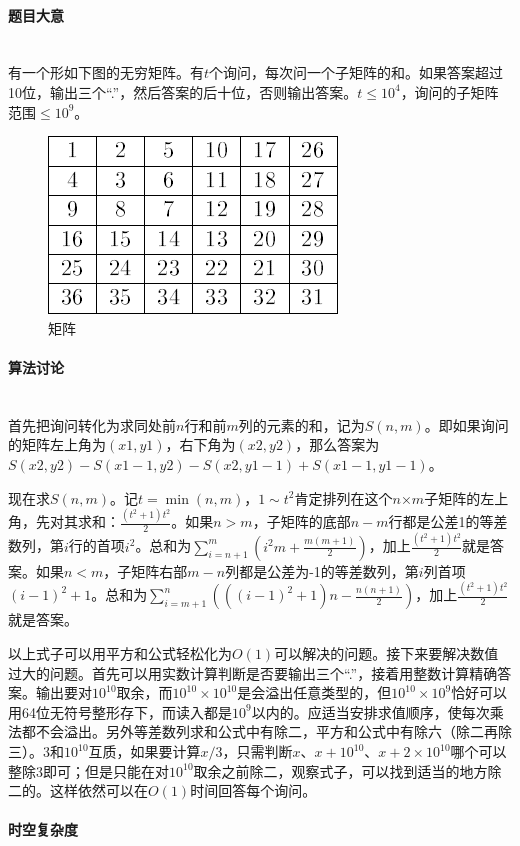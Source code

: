 \documentclass[UTF8]{ctexart}
\newcommand{\myparagraph}[1]{\paragraph{#1}\mbox{}\\}
\theoremstyle{nonumberplain}
\begin{document}
		\myparagraph{题目大意}
		
			有一个形如下图的无穷矩阵。有$t$个询问，每次问一个子矩阵的和。如果答案超过10位，输出三个“.”，然后答案的后十位，否则输出答案。$t \leq 10^4$，询问的子矩阵范围$\leq 10^9$。
			
			\begin{figure}[ht]
				\centering
				\includegraphics[width=.7\textwidth]{fig249e_1.png}
				\caption{矩阵}
			\end{figure}
		
		\myparagraph{算法讨论}
		
			首先把询问转化为求同处前$n$行和前$m$列的元素的和，记为$S(n,m)$。即如果询问的矩阵左上角为$(x1,y1)$，右下角为$(x2,y2)$，那么答案为$S(x2,y2)-S(x1-1,y2)-S(x2,y1-1)+S(x1-1,y1-1)$。
			
			现在求$S(n,m)$。记$t=\min(n,m)$，$1 \sim t^2$肯定排列在这个$n$×$m$子矩阵的左上角，先对其求和：$\frac{(t^2+1)t^2}{2}$。如果$n>m$，子矩阵的底部$n-m$行都是公差1的等差数列，第$i$行的首项$i^2$。总和为$\sum_{i=n+1}^m(i^2m+\frac{m(m+1)}{2})$，加上$\frac{(t^2+1)t^2}{2}$就是答案。如果$n<m$，子矩阵右部$m-n$列都是公差为-1的等差数列，第$i$列首项$(i-1)^2+1$。总和为$\sum_{i=m+1}^n(((i-1)^2+1)n-\frac{n(n+1)}{2})$，加上$\frac{(t^2+1)t^2}{2}$就是答案。
			
			以上式子可以用平方和公式轻松化为$O(1)$可以解决的问题。接下来要解决数值过大的问题。首先可以用实数计算判断是否要输出三个“.”，接着用整数计算精确答案。输出要对$10^{10}$取余，而$10^{10} \times 10^{10}$是会溢出任意类型的，但$10^{10} \times 10^9$恰好可以用64位无符号整形存下，而读入都是$10^9$以内的。应适当安排求值顺序，使每次乘法都不会溢出。另外等差数列求和公式中有除二，平方和公式中有除六（除二再除三）。3和$10^{10}$互质，如果要计算$x/3$，只需判断$x$、$x+10^{10}$、$x+2 \times 10^{10}$哪个可以整除3即可；但是只能在对$10^{10}$取余之前除二，观察式子，可以找到适当的地方除二的。这样依然可以在$O(1)$时间回答每个询问。
		
		\myparagraph{时空复杂度}
		
\end{document}
